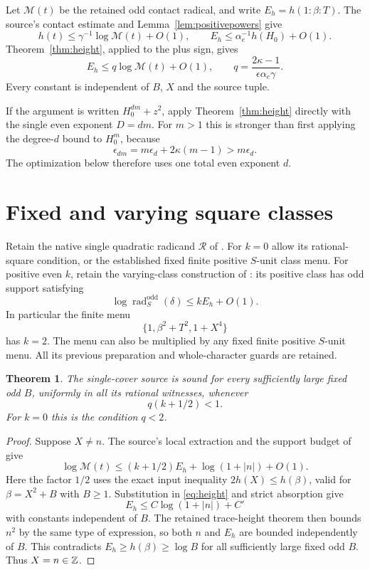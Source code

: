 \documentclass[11pt,a4paper]{article}
\newtheorem{theorem}{Theorem}[section]
\begin{document}
Let $\mathcal M(t)$ be the retained odd contact radical, and write
$E_h=h(1:\beta:T)$. The source's contact estimate and
Lemma~\ref{lem:positivepowers} give
\[
 h(t)\le\gamma^{-1}\log\mathcal M(t)+O(1),\qquad
 E_h\le\alpha_e^{-1}h(H_0)+O(1).
\]
Theorem~\ref{thm:height}, applied to the plus sign, gives
\begin{equation}\label{eq:height}
 E_h\le q\log\mathcal M(t)+O(1),\qquad
 q=\frac{2\kappa-1}{\epsilon\alpha_e\gamma}.
\end{equation}
Every constant is independent of $B$, $X$ and the source tuple.

If the argument is written $H_0^{dm}+z^2$, apply
Theorem~\ref{thm:height} directly
with the single even exponent $D=dm$. For $m>1$ this is stronger
than first applying the degree-$d$ bound to $H_0^m$, because
\[
 \epsilon_{dm}=m\epsilon_d+2\kappa(m-1)>m\epsilon_d.
\]
The optimization below therefore uses one total even exponent $d$.

\section{Fixed and varying square classes}

Retain the native single quadratic radicand $\mathcal R$ of
\cite{Single}. For $k=0$ allow its rational-square condition, or
the established fixed finite positive $S$-unit class menu. For
positive even $k$, retain the varying-class construction of
\cite{Classes}: its positive class has odd support satisfying
\[
 \log\operatorname{rad}_{S}^{\mathrm{odd}}(\delta)
       \le k E_h+O(1).
\]
In particular the finite menu
\[
 \{1,\beta^2+T^2,1+X^4\}
\]
has $k=2$. The menu can also be multiplied by any fixed finite
positive $S$-unit menu. All its previous preparation and
whole-character guards are retained.

\begin{theorem}\label{thm:sound}
The single-cover source is sound for every sufficiently large fixed
odd $B$, uniformly in all its rational witnesses, whenever
\begin{equation}\label{eq:absorption}
 q(k+1/2)<1.
\end{equation}
For $k=0$ this is the condition $q<2$.
\end{theorem}
\begin{proof}
Suppose $X\ne n$. The source's local extraction and the support
budget of \cite{Classes} give
\[
 \log\mathcal M(t)
 \le(k+1/2)E_h+\log(1+|n|)+O(1).
\]
Here the factor $1/2$ uses the exact input inequality
$2h(X)\le h(\beta)$, valid for $\beta=X^2+B$ with $B\ge1$.
Substitution in \eqref{eq:height} and strict absorption give
\[
 E_h\le C\log(1+|n|)+C'
\]
with constants independent of $B$. The retained trace-height theorem
then bounds $n^2$ by the same type of expression, so both $n$ and
$E_h$ are bounded independently of $B$. This contradicts
$E_h\ge h(\beta)\ge\log B$ for all sufficiently large fixed
odd $B$. Thus $X=n\in\mathbb Z$.
\end{proof}
\end{document}
